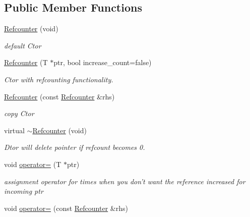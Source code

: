 \subsection*{Public Member Functions}
\begin{DoxyCompactItemize}
\item 
\hyperlink{classMadara_1_1Utility_1_1Refcounter_ae310081bf25bb611ea18d639a0c3caae}{Refcounter} (void)
\begin{DoxyCompactList}\small\item\em default Ctor \item\end{DoxyCompactList}\item 
\hyperlink{classMadara_1_1Utility_1_1Refcounter_a288d12751e716e13c36ae4cb3bd5e90a}{Refcounter} (T $\ast$ptr, bool increase\_\-count=false)
\begin{DoxyCompactList}\small\item\em Ctor with refcounting functionality. \item\end{DoxyCompactList}\item 
\hyperlink{classMadara_1_1Utility_1_1Refcounter_a61b323e61f90387fd8a456422c00c282}{Refcounter} (const \hyperlink{classMadara_1_1Utility_1_1Refcounter}{Refcounter} \&rhs)
\begin{DoxyCompactList}\small\item\em copy Ctor \item\end{DoxyCompactList}\item 
virtual \hyperlink{classMadara_1_1Utility_1_1Refcounter_a6ccb4088175e3179fd2c8a6cd218d2c3}{$\sim$Refcounter} (void)
\begin{DoxyCompactList}\small\item\em Dtor will delete pointer if refcount becomes 0. \item\end{DoxyCompactList}\item 
void \hyperlink{classMadara_1_1Utility_1_1Refcounter_a45393aae13393668ec5896c1848741d3}{operator=} (T $\ast$ptr)
\begin{DoxyCompactList}\small\item\em assignment operator for times when you don't want the reference increased for incoming ptr \item\end{DoxyCompactList}\item 
void \hyperlink{classMadara_1_1Utility_1_1Refcounter_a608ba8270d64865b392047d1d26f0d66}{operator=} (const \hyperlink{classMadara_1_1Utility_1_1Refcounter}{Refcounter} \&rhs)

\end{DoxyCompactItemize}
